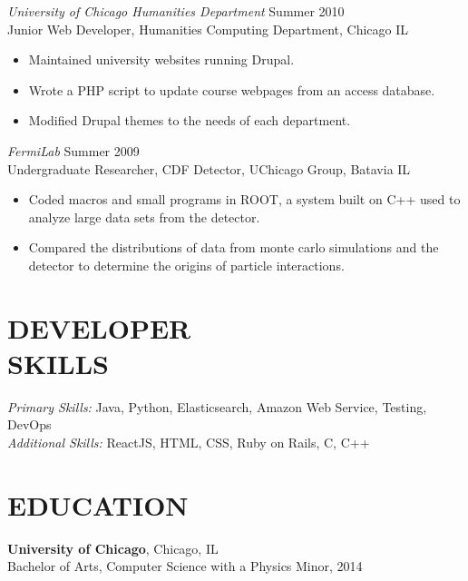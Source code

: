 \documentclass[line,margin]{res}
\begin{document}
\begin{resume}
  {\sl University of Chicago Humanities Department}
  \hfill Summer 2010 \\
  Junior Web Developer, Humanities Computing Department,
  Chicago IL
  \begin{itemize}  \itemsep-2pt
  \item Maintained university websites running Drupal.
  \item Wrote a PHP script to update course webpages from an access database.
  \item Modified Drupal themes to the needs of each department.
  \end{itemize}

  
  {\sl FermiLab} \hfill Summer 2009 \\
  Undergraduate Researcher, CDF Detector, UChicago Group, Batavia IL
  \begin{itemize}  \itemsep-2pt
  \item Coded macros and small programs in ROOT, a system built on C++ used to analyze large data sets from the detector.
  \item Compared the distributions of data from monte carlo simulations and the detector to determine the origins of particle interactions.
  \end{itemize}
  
  \section{DEVELOPER \\ SKILLS} {\sl Primary Skills:}
  Java, Python, Elasticsearch, Amazon Web Service, Testing, DevOps \\
  {\sl Additional Skills:} ReactJS, HTML, CSS, Ruby on Rails, C, C++
  
  
  \section{EDUCATION} {\bf University of Chicago}, Chicago, IL \\
  Bachelor of Arts, Computer Science with a Physics Minor, 2014\\

  
  
\end{resume}
\end{document}
